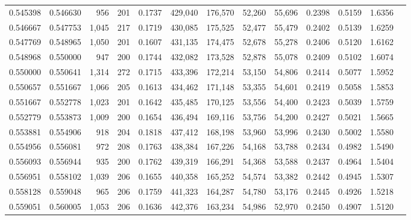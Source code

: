 \begin{tabular}{rrrrrrrrrrrrr}
0.545398 & 0.546630 &    956 &   201 &                                     0.1737 & 429,040 & 176,570 &  52,260 &  55,696 & 0.2398 & 0.5159 & 1.6356 \\
0.546667 & 0.547753 &  1,045 &   217 &                                     0.1719 & 430,085 & 175,525 &  52,477 &  55,479 & 0.2402 & 0.5139 & 1.6259 \\
0.547769 & 0.548965 &  1,050 &   201 &                                     0.1607 & 431,135 & 174,475 &  52,678 &  55,278 & 0.2406 & 0.5120 & 1.6162 \\
0.548968 & 0.550000 &    947 &   200 &                                     0.1744 & 432,082 & 173,528 &  52,878 &  55,078 & 0.2409 & 0.5102 & 1.6074 \\
0.550000 & 0.550641 &  1,314 &   272 &                                     0.1715 & 433,396 & 172,214 &  53,150 &  54,806 & 0.2414 & 0.5077 & 1.5952 \\
0.550657 & 0.551667 &  1,066 &   205 &                                     0.1613 & 434,462 & 171,148 &  53,355 &  54,601 & 0.2419 & 0.5058 & 1.5853 \\
0.551667 & 0.552778 &  1,023 &   201 &                                     0.1642 & 435,485 & 170,125 &  53,556 &  54,400 & 0.2423 & 0.5039 & 1.5759 \\
0.552779 & 0.553873 &  1,009 &   200 &                                     0.1654 & 436,494 & 169,116 &  53,756 &  54,200 & 0.2427 & 0.5021 & 1.5665 \\
0.553881 & 0.554906 &    918 &   204 &                                     0.1818 & 437,412 & 168,198 &  53,960 &  53,996 & 0.2430 & 0.5002 & 1.5580 \\
0.554956 & 0.556081 &    972 &   208 &                                     0.1763 & 438,384 & 167,226 &  54,168 &  53,788 & 0.2434 & 0.4982 & 1.5490 \\
0.556093 & 0.556944 &    935 &   200 &                                     0.1762 & 439,319 & 166,291 &  54,368 &  53,588 & 0.2437 & 0.4964 & 1.5404 \\
0.556951 & 0.558102 &  1,039 &   206 &                                     0.1655 & 440,358 & 165,252 &  54,574 &  53,382 & 0.2442 & 0.4945 & 1.5307 \\
0.558128 & 0.559048 &    965 &   206 &                                     0.1759 & 441,323 & 164,287 &  54,780 &  53,176 & 0.2445 & 0.4926 & 1.5218 \\
0.559051 & 0.560005 &  1,053 &   206 &                                     0.1636 & 442,376 & 163,234 &  54,986 &  52,970 & 0.2450 & 0.4907 & 1.5120 \\

\end{tabular}
